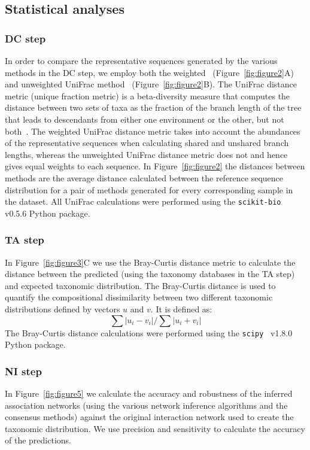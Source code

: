   \subsection*{Statistical analyses}

  \subsubsection*{DC step}
  \vspace{-5mm}
  In order to compare the representative sequences generated by the various methods in the DC step, we employ both the weighted~\cite{Lozupone2007} (Figure~\ref{fig:figure2}A) and unweighted UniFrac method~\cite{Lozupone2005} (Figure~\ref{fig:figure2}B).
  The UniFrac distance metric (unique fraction metric) is a beta-diversity measure that computes the distance between two sets of taxa as the fraction of the branch length of the tree that leads to descendants from either one environment or the other, but not both~\cite{Lozupone2005}.
  The weighted UniFrac distance metric takes into account the abundances of the representative sequences when calculating shared and unshared branch lengths, whereas the unweighted UniFrac distance metric does not and hence gives equal weights to each sequence.
  In Figure~\ref{fig:figure2} the distances between methods are the average distance calculated between the reference sequence distribution for a pair of methods generated for every corresponding sample in the dataset.
  All UniFrac calculations were performed using the \texttt{scikit-bio}~\cite{thescikit-biodevelopmentteamScikitbioBioinformaticsLibrary2022} v0.5.6 Python package.

  \subsubsection*{TA step}
  \vspace{-5mm}
  In Figure~\ref{fig:figure3}C we use the Bray-Curtis distance metric to calculate the distance between the predicted (using the taxonomy databases in the TA step) and expected taxonomic distribution.
  The Bray-Curtis distance is used to quantify the compositional dissimilarity between two different taxonomic distributions defined by vectors $u$ and $v$.
  It is defined as:
  $$\sum{|u_i-v_i|} / \sum{|u_i+v_i|}$$
  The Bray-Curtis distance calculations were performed using the \texttt{scipy}~\cite{virtanenSciPyFundamentalAlgorithms2020} v1.8.0 Python package.

  \subsubsection*{NI step}
  \vspace{-5mm}
  In Figure~\ref{fig:figure5} we calculate the accuracy and robustness of the inferred association networks (using the various network inference algorithms and the consensus methods) against the original interaction network used to create the taxonomic distribution.
  We use precision and sensitivity to calculate the accuracy of the predictions.

